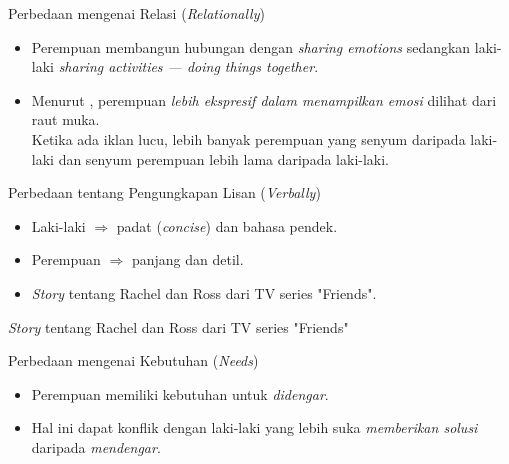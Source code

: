 \documentclass{beamer}
\theoremstyle{mystyle}
\begin{document}
\begin{frame}{Perbedaan mengenai Relasi (\textit{Relationally})}
	\begin{itemize}
		\item<2-> Perempuan membangun hubungan dengan \textit{sharing emotions} sedangkan laki-laki \textit{sharing activities --- doing things together}.
		\hfill \break
		\item<3-> Menurut \citet{mayemotional2017}, perempuan \textit{lebih ekspresif dalam menampilkan emosi} dilihat dari raut muka.\\
		Ketika ada iklan lucu, lebih banyak perempuan yang senyum daripada laki-laki dan senyum perempuan lebih lama daripada laki-laki.
	\end{itemize}
\end{frame}

\begin{frame}{Perbedaan tentang Pengungkapan Lisan (\textit{Verbally})}
	\begin{itemize}
		\item<1-> Laki-laki $\Longrightarrow$ padat (\textit{concise}) dan bahasa pendek.
		\hfill \break
		\item<2-> Perempuan $\Longrightarrow$ panjang dan detil.
		\hfill \break
		\item<3-> \textit{Story} tentang Rachel dan Ross dari TV series "Friends".
	\end{itemize}
\end{frame}

\begin{frame}{\textit{Story} tentang Rachel dan Ross dari TV series "Friends"}
	\begin{center}
	\end{center}
\end{frame}

\begin{frame}{Perbedaan mengenai Kebutuhan (\textit{Needs})}
		\begin{itemize}
			\item Perempuan memiliki kebutuhan untuk \textit{didengar}.
			\hfill \break
			\item<2-> Hal ini dapat konflik dengan laki-laki yang lebih suka \textit{memberikan solusi} daripada \textit{mendengar}.
		\end{itemize}			
\end{frame}
\end{document}
